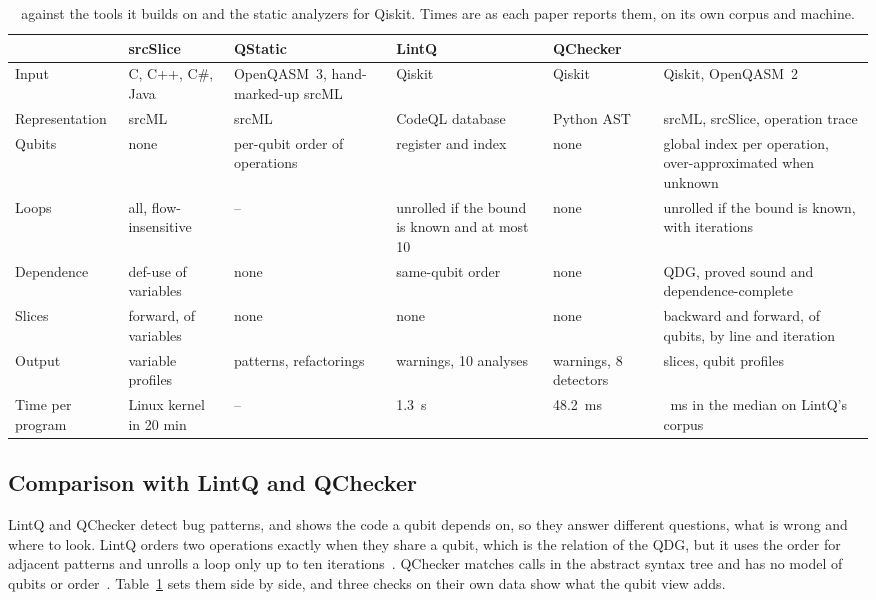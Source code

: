 \begin{table}[t]
  \centering
  \caption{\tool{} against the tools it builds on and the static analyzers for Qiskit. Times are as each
  paper reports them, on its own corpus and machine.}
  \label{tab:tools}
  \footnotesize\setlength{\tabcolsep}{3.2pt}
  \begin{tabular}{@{}l p{2.75cm} p{2.75cm} p{2.9cm} p{2.6cm} p{3.85cm}@{}}
    \toprule
    & srcSlice~\cite{alomari2014srcslice} & QStatic~\cite{behler2025static} & LintQ~\cite{paltenghi2024lintq} &
    QChecker~\cite{zhao2023qchecker} & \tool{} \\
    \midrule
    Input & C, C++, C\#, Java & OpenQASM~3, hand-marked-up srcML & Qiskit & Qiskit & Qiskit, OpenQASM~2 \\
    Representation & srcML & srcML & CodeQL database & Python AST & srcML, srcSlice, operation trace \\
    Qubits & none & per-qubit order of operations & register and index & none & global index per operation,
    over-approximated when unknown \\
    Loops & all, flow-insensitive & -- & unrolled if the bound is known and at most 10 & none &
    unrolled if the bound is known, with iterations \\
    Dependence & def-use of variables & none & same-qubit order & none & QDG, proved sound and
    dependence-complete \\
    Slices & forward, of variables & none & none & none & backward and forward, of qubits, by line and
    iteration \\
    Output & variable profiles & patterns, refactorings & warnings, 10 analyses & warnings, 8 detectors &
    slices, qubit profiles \\
    Time per program & Linux kernel in 20 min & -- & 1.3~s & 48.2~ms & \numScaleSOneMedianMs{}~ms in the
    median on LintQ's corpus \\
    \bottomrule
  \end{tabular}
\end{table}

\subsection{Comparison with LintQ and QChecker}
LintQ and QChecker detect bug patterns, and \tool{} shows the code a qubit depends on, so they answer different
questions, what is wrong and where to look. LintQ orders two operations exactly when they share a qubit, which is
the relation of the QDG, but it uses the order for adjacent patterns and unrolls a loop only up to ten
iterations~\cite{paltenghi2024lintq}. QChecker matches calls in the abstract syntax tree and has no model of
qubits or order~\cite{zhao2023qchecker}. Table~\ref{tab:tools} sets them side by side, and three checks on their
own data show what the qubit view adds.

